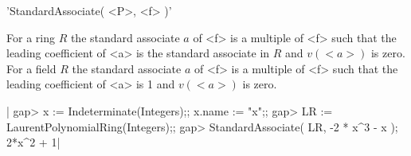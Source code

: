 \vspace{5mm}
'StandardAssociate( <P>, <f> )'%

For a ring $R$ the standard  associate $a$  of  <f> is a multiple of  <f>
such that the leading coefficient of <a> is the standard associate in $R$
and $v(<a>)$ is zero. For a field $R$ the  standard  associate $a$ of <f>
is a multiple of <f> such  that the leading coefficient  of <a>  is 1 and
$v(<a>)$ is zero.

|    gap> x := Indeterminate(Integers);; x.name := "x";;
    gap> LR := LaurentPolynomialRing(Integers);;
    gap> StandardAssociate( LR, -2 * x^3 - x );
    2*x^2 + 1|

